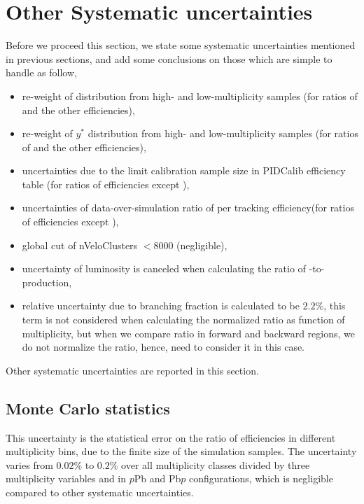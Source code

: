 \section{Other Systematic uncertainties}
\label{Systematic uncertainty}
Before we proceed this section, we state some systematic uncertainties mentioned in previous sections, and add some conclusions on those which are simple to handle as follow,
\begin{itemize}
    \item re-weight of \pt distribution from high- and low-multiplicity samples (for ratios of \effAcc and the other efficiencies),
    \item re-weight of $y^*$ distribution from high- and low-multiplicity samples (for ratios of \effAcc and the other efficiencies),
    \item uncertainties due to the limit calibration sample size in PIDCalib efficiency table (for ratios of efficiencies except \effAcc),
    \item uncertainties of data-over-simulation ratio of per tracking efficiency(for ratios of efficiencies except \effAcc),
    \item global cut of nVeloClusters $<8000$ (negligible),
    \item uncertainty of luminosity is canceled when calculating the ratio of \psitwos-to-\jpsi production,
    \item relative uncertainty due to branching fraction is calculated to be $2.2\%$, this term is not considered when calculating the normalized ratio as function of multiplicity, but when we compare ratio in forward and backward regions, we do not normalize the ratio, hence, need to consider it in this case.
\end{itemize}

Other systematic uncertainties are reported in this section.
\subsection{Monte Carlo statistics}
This uncertainty is the statistical error on the ratio of efficiencies in different multiplicity bins, due to the finite size of the simulation samples. The uncertainty varies from $0.02\%$ to $0.2\%$ over all multiplicity classes divided by three multiplicity variables and in $p$Pb and Pb$p$ configurations, which is negligible compared to other systematic uncertainties.

